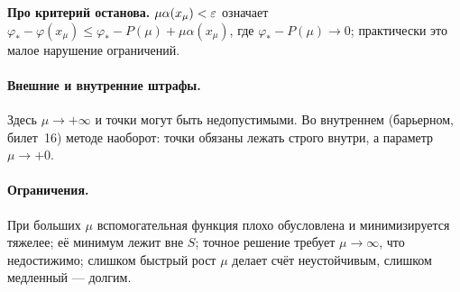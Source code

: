 \textbf{Про критерий останова.} $\mu\alpha(x_\mu) < \varepsilon$ означает
$\varphi_* - \varphi(x_\mu) \le \varphi_* - P(\mu) + \mu\alpha(x_\mu)$, где
$\varphi_* - P(\mu) \to 0$; практически это малое нарушение ограничений.

\paragraph{Внешние и внутренние штрафы.}
Здесь $\mu \to +\infty$ и точки могут быть недопустимыми. Во внутреннем
(барьерном, билет~16) методе наоборот: точки обязаны лежать строго внутри, а
параметр $\mu \to +0$.

\paragraph{Ограничения.}
При больших $\mu$ вспомогательная функция плохо обусловлена и минимизируется
тяжелее; её минимум лежит вне $S$; точное решение требует $\mu \to \infty$,
что недостижимо; слишком быстрый рост $\mu$ делает счёт неустойчивым,
слишком медленный — долгим.

